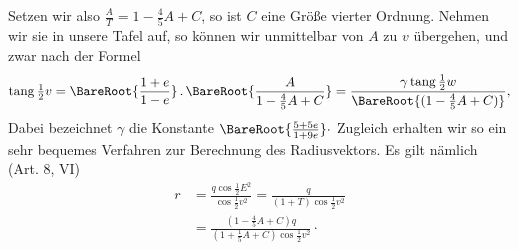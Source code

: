 Setzen wir also $\frac{A}{T}=1-\frac{4}{5}A+C$, so ist $C$ eine Größe vierter Ordnung. Nehmen wir sie in unsere Tafel auf, so können wir unmittelbar von $A$ zu $v$ übergehen, und zwar nach der Formel
\[
\operatorname{tang}\tfrac{1}{2}v=\BareRoot{\frac{1+e}{1-e}}\,\mathord{.}\,\BareRoot{\frac{A}{1-\frac{4}{5}A+C}}=\frac{\gamma\operatorname{tang}\tfrac{1}{2}w}{\BareRoot{(1-\frac{4}{5}A+C)}},
\]
Dabei bezeichnet $\gamma$ die Konstante $\BareRoot{\frac{5+5e}{1+9e}}\cdot$ Zugleich erhalten wir so ein sehr bequemes Verfahren zur Berechnung des Radiusvektors. Es gilt nämlich (Art. 8, VI)
\[
\begin{aligned}
r&=\frac{q\cos\tfrac{1}{2}E^2}{\cos\tfrac{1}{2}v^2}=\frac{q}{(1+T)\cos\tfrac{1}{2}v^2}\\
&=\frac{(1-\frac{4}{5}A+C)q}{(1+\frac{1}{5}A+C)\cos\tfrac{1}{2}v^2}\cdot
\end{aligned}
\]
